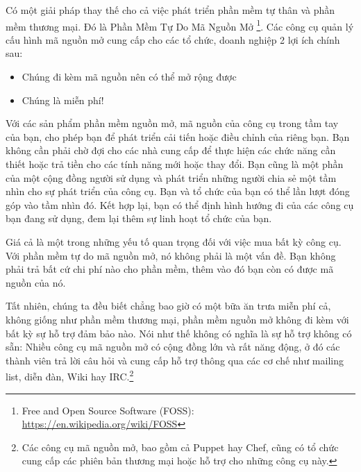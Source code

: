 Có một giải pháp thay thế cho cả việc phát triển phần mềm tự thân và phần mềm thương mại. Đó là Phần Mềm Tự Do Mã Nguồn Mở \footnote{Free and Open Source Software (FOSS): \url{https://en.wikipedia.org/wiki/FOSS}}. Các công cụ quản lý cấu hình mã nguồn mở cung cấp cho các tổ chức, doanh nghiệp 2 lợi ích chính sau:

\begin{itemize}
\item Chúng đi kèm mã nguồn nên có thể mở rộng được
\item Chúng là miễn phí!
\end{itemize}

Với các sản phẩm phần mềm nguồn mở, mã nguồn của công cụ trong tầm tay của bạn, cho phép bạn để phát triển cải tiến hoặc điều chỉnh của riêng bạn. Bạn không cần phải chờ đợi cho các nhà cung cấp để thực hiện các chức năng cần thiết hoặc trả tiền cho các tính năng mới hoặc thay đổi. Bạn cũng là một phần của một cộng đồng người sử dụng và phát triển những người chia sẻ một tầm nhìn cho sự phát triển của công cụ. Bạn và tổ chức của bạn có thể lần lượt đóng góp vào tầm nhìn đó. Kết hợp lại, bạn có thể định hình hướng đi của các công cụ bạn đang sử dụng, đem lại thêm sự linh hoạt tổ chức của bạn.

Giá cả là một trong những yếu tố quan trọng đối với việc mua bất kỳ công cụ. Với phần mềm tự do mã nguồn mở, nó không phải là một vấn đề. Bạn không phải trả bất cứ chi phí nào cho phần mềm, thêm vào đó bạn còn có được mã nguồn của nó.

Tất nhiên, chúng ta đều biết chẳng bao giờ có một bữa ăn trưa miễn phí cả, không giống như phần mềm thương mại, phần mềm nguồn mở không đi kèm với bất kỳ sự hỗ trợ đảm bảo nào. Nói như thế không có nghĩa là sự hỗ trợ không có sẵn: Nhiều công cụ mã nguồn mở có cộng đồng lớn và rất năng động, ở đó các thành viên trả lời câu hỏi và cung cấp hỗ trợ thông qua các cơ chế như mailing list, diễn đàn, Wiki hay IRC.\footnote{Các công cụ mã nguồn mở, bao gồm cả Puppet hay Chef, cũng có tổ chức cung cấp các phiên bản thương mại hoặc hỗ trợ cho những công cụ này.}
